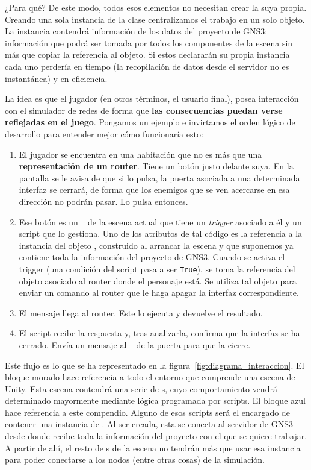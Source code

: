 ¿Para qué? De este modo, todos esos elementos no necesitan crear la suya propia. Creando una sola instancia de la clase centralizamos el trabajo en un solo objeto. La instancia contendrá información de los datos del proyecto de GNS3; información que podrá ser tomada por todos los componentes de la escena sin más que copiar la referencia al objeto. Si estos declararán su propia instancia cada uno perdería en tiempo (la recopilación de datos desde el servidor no es instantánea) y en eficiencia.

La idea es que el jugador (en otros términos, el usuario final), posea interacción con el simulador de redes de forma que \textbf{las consecuencias puedan verse reflejadas en el juego}. Pongamos un ejemplo e invirtamos el orden lógico de desarrollo para entender mejor cómo funcionaría esto:

\begin{enumerate}
\item El jugador se encuentra en una habitación que no es más que una \textbf{representación de un router}. Tiene un botón justo delante suya. En la pantalla se le avisa de que si lo pulsa, la puerta asociada a una determinada interfaz se cerrará, de forma que los enemigos que se ven acercarse en esa dirección no podrán pasar. Lo pulsa entonces.
\item Ese botón es un \GAOBJ~ de la escena actual que tiene un \textit{trigger} asociado a él y un script que lo gestiona. Uno de los atributos de tal código es la referencia a la instancia del objeto \GNSCS, construido al arrancar la escena y que suponemos ya contiene toda la información del proyecto de GNS3. Cuando se activa el trigger (una condición del script pasa a ser \texttt{True}), se toma la referencia del objeto asociado al router donde el personaje está. Se utiliza tal objeto para enviar un comando al router que le haga apagar la interfaz correspondiente.
\item El mensaje llega al router. Este lo ejecuta y devuelve el resultado.
\item El script recibe la respuesta y, tras analizarla, confirma que la interfaz se ha cerrado. Envía un mensaje al \GAOBJ~ de la puerta para que la cierre.
\end{enumerate}

Este flujo es lo que se ha representado en la figura~\ref{fig:diagrama_interaccion}. El bloque morado hace referencia a todo el entorno que comprende una escena de Unity. Esta escena contendrá una serie de \GAOBJ s, cuyo comportamiento vendrá determinado mayormente mediante lógica programada por scripts. El bloque azul hace referencia a este compendio. Alguno de esos scripts será el encargado de contener una instancia de \GNSCS . Al ser creada, esta se conecta al servidor de GNS3 desde donde recibe toda la información del proyecto con el que se quiere trabajar. A partir de ahí, el resto de \GAOBJ s de la escena no tendrán más que usar esa instancia para poder conectarse a los nodos (entre otras cosas) de la simulación. 


